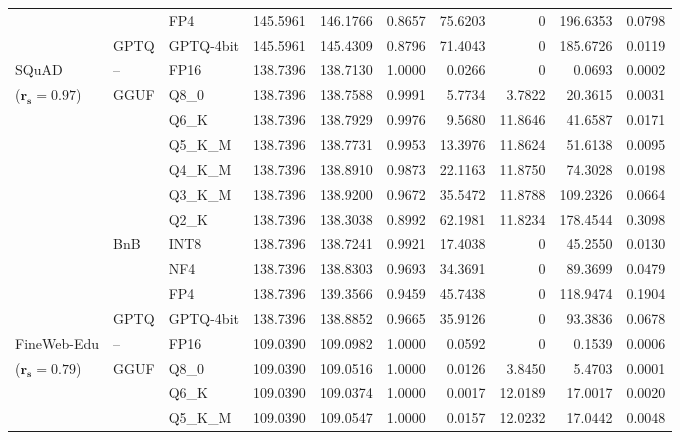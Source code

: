 \begin{longtable}{ll l rrrrrrr}
 &  & FP4 & 145.5961 & 146.1766 & \cellcolor{red!18} 0.8657 & \cellcolor{red!18} 75.6203 & \cellcolor{cyan!12} $0$ & \cellcolor{red!18} 196.6353 & \cellcolor{red!18} 0.0798 \\
 & GPTQ & GPTQ-4bit & 145.5961 & 145.4309 & \cellcolor{red!18} 0.8796 & \cellcolor{red!18} 71.4043 & \cellcolor{cyan!12} $0$ & \cellcolor{red!18} 185.6726 & \cellcolor{red!18} 0.0119 \\
\midrule
SQuAD & -- & FP16 & 138.7396 & 138.7130 & 1.0000 & 0.0266 & \cellcolor{cyan!12} $0$ & 0.0693 & 0.0002 \\
{\small ($\mathbf{r_s{=}0.97}$)} & GGUF & Q8\_0 & 138.7396 & 138.7588 & 0.9991 & 5.7734 & 3.7822 & 20.3615 & 0.0031 \\
 &  & Q6\_K & 138.7396 & 138.7929 & 0.9976 & 9.5680 & 11.8646 & 41.6587 & 0.0171 \\
 &  & Q5\_K\_M & 138.7396 & 138.7731 & 0.9953 & 13.3976 & 11.8624 & 51.6138 & 0.0095 \\
 &  & Q4\_K\_M & 138.7396 & 138.8910 & 0.9873 & 22.1163 & 11.8750 & 74.3028 & 0.0198 \\
 &  & Q3\_K\_M & 138.7396 & 138.9200 & 0.9672 & 35.5472 & 11.8788 & 109.2326 & 0.0664 \\
 &  & Q2\_K & 138.7396 & 138.3038 & \cellcolor{red!18} 0.8992 & \cellcolor{red!18} 62.1981 & 11.8234 & \cellcolor{red!18} 178.4544 & \cellcolor{red!18} 0.3098 \\
 & BnB & INT8 & 138.7396 & 138.7241 & 0.9921 & 17.4038 & \cellcolor{cyan!12} $0$ & 45.2550 & 0.0130 \\
 &  & NF4 & 138.7396 & 138.8303 & 0.9693 & 34.3691 & \cellcolor{cyan!12} $0$ & 89.3699 & 0.0479 \\
 &  & FP4 & 138.7396 & 139.3566 & \cellcolor{red!18} 0.9459 & \cellcolor{red!18} 45.7438 & \cellcolor{cyan!12} $0$ & \cellcolor{red!18} 118.9474 & \cellcolor{red!18} 0.1904 \\
 & GPTQ & GPTQ-4bit & 138.7396 & 138.8852 & 0.9665 & 35.9126 & \cellcolor{cyan!12} $0$ & 93.3836 & 0.0678 \\
\midrule
FineWeb-Edu & -- & FP16 & 109.0390 & 109.0982 & 1.0000 & 0.0592 & \cellcolor{cyan!12} $0$ & 0.1539 & 0.0006 \\
{\small ($\mathbf{r_s{=}0.79}$)} & GGUF & Q8\_0 & 109.0390 & 109.0516 & 1.0000 & 0.0126 & 3.8450 & 5.4703 & 0.0001 \\
 &  & Q6\_K & 109.0390 & 109.0374 & 1.0000 & 0.0017 & 12.0189 & 17.0017 & 0.0020 \\
 &  & Q5\_K\_M & 109.0390 & 109.0547 & 1.0000 & 0.0157 & 12.0232 & 17.0442 & 0.0048 \\

\end{longtable}
